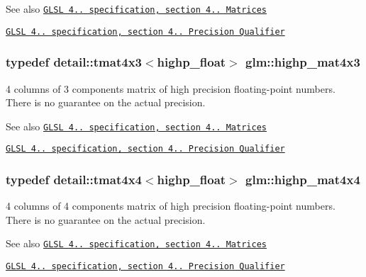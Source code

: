 \begin{DoxySeeAlso}{See also}
\href{http://www.opengl.org/registry/doc/GLSLangSpec.4.20.8.pdf}{\tt G\+L\+S\+L 4.. specification, section 4.. Matrices} 

\href{http://www.opengl.org/registry/doc/GLSLangSpec.4.20.8.pdf}{\tt G\+L\+S\+L 4.. specification, section 4.. Precision Qualifier} 
\end{DoxySeeAlso}
\hypertarget{group__core__precision_ga940a4f42a51d8dee13869ca90aa24df6}{}
\subsubsection[{highp\+\_\+mat4x3}]{\setlength{\rightskip}{0pt plus 5cm}typedef detail\+::tmat4x3$<$highp\+\_\+float$>$ {\bf glm\+::highp\+\_\+mat4x3}}\label{group__core__precision_ga940a4f42a51d8dee13869ca90aa24df6}
4 columns of 3 components matrix of high precision floating-\/point numbers. There is no guarantee on the actual precision.

\begin{DoxySeeAlso}{See also}
\href{http://www.opengl.org/registry/doc/GLSLangSpec.4.20.8.pdf}{\tt G\+L\+S\+L 4.. specification, section 4.. Matrices} 

\href{http://www.opengl.org/registry/doc/GLSLangSpec.4.20.8.pdf}{\tt G\+L\+S\+L 4.. specification, section 4.. Precision Qualifier} 
\end{DoxySeeAlso}
\hypertarget{group__core__precision_gaa277c02de6192621d520335f0d2e4930}{}
\subsubsection[{highp\+\_\+mat4x4}]{\setlength{\rightskip}{0pt plus 5cm}typedef detail\+::tmat4x4$<$highp\+\_\+float$>$ {\bf glm\+::highp\+\_\+mat4x4}}\label{group__core__precision_gaa277c02de6192621d520335f0d2e4930}
4 columns of 4 components matrix of high precision floating-\/point numbers. There is no guarantee on the actual precision.

\begin{DoxySeeAlso}{See also}
\href{http://www.opengl.org/registry/doc/GLSLangSpec.4.20.8.pdf}{\tt G\+L\+S\+L 4.. specification, section 4.. Matrices} 

\href{http://www.opengl.org/registry/doc/GLSLangSpec.4.20.8.pdf}{\tt G\+L\+S\+L 4.. specification, section 4.. Precision Qualifier} 
\end{DoxySeeAlso}
\hypertarget{group__core__precision_gabfd1cf11193324a5f77d3831b6ac3205}{}
